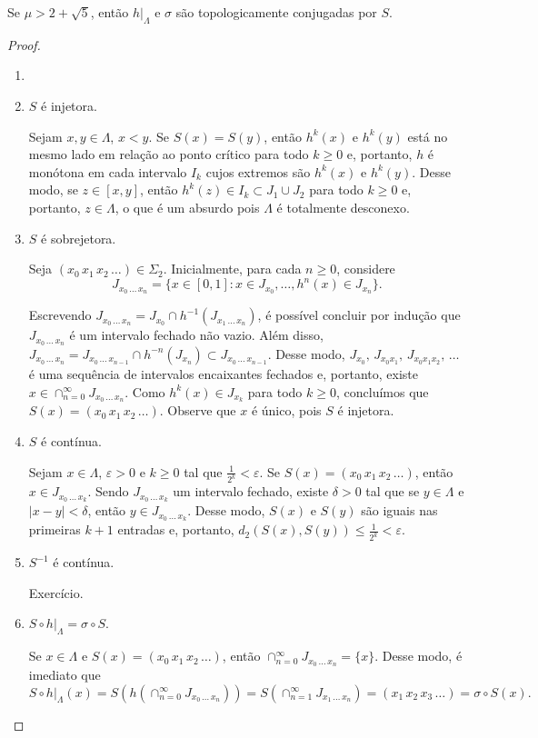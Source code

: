 \begin{theorem}
Se $\mu > 2 + \sqrt{5}$, então $h|_\Lambda$ e $\sigma$ são topologicamente conjugadas por $S$.
\end{theorem}

\begin{proof}
\begin{enumerate}[label=\alph*)]\item[]
\item $S$ é injetora.

Sejam $x, y \in \Lambda$, $x < y$. Se $S(x) = S(y)$, então $h^k(x)$ e $h^k(y)$ está no mesmo lado em relação ao ponto crítico para todo $k \geq 0$ e, portanto, $h$ é monótona em cada intervalo $I_k$ cujos extremos são $h^k(x)$ e $h^k(y)$. Desse modo, se $z \in [x, y]$, então $h^k(z) \in I_k \subset J_1 \cup J_2$ para todo $k \geq 0$ e, portanto, $z \in \Lambda$, o que é um absurdo pois $\Lambda$ é totalmente desconexo.

\item $S$ é sobrejetora.

Seja $(x_0 \, x_1 \, x_2 \, \dots) \in \Sigma_2$. Inicialmente, para cada $n \geq 0$, considere
$$J_{x_0 \, \dots \, x_n} = \lbrace x \in [0,1] : x \in J_{x_0}, \dots, h^n(x) \in J_{x_n} \rbrace.$$

Escrevendo $J_{x_0 \, \dots \, x_n} = J_{x_0} \cap h^{-1}(J_{x_1 \, \dots \, x_n})$, é possível concluir por indução que $J_{x_0 \, \dots \, x_n}$ é um intervalo fechado não vazio.
Além disso, $J_{x_0 \, \dots \, x_n} = J_{x_0 \, \dots \, x_{n-1}} \cap h^{-n}(J_{x_n}) \subset J_{x_0 \, \dots \, x_{n-1}}$.
Desse modo, $J_{x_0}, \, J_{x_0 x_1}, \, J_{x_0 x_1 x_2}, \, \dots$ é uma sequência de intervalos encaixantes fechados e, portanto, existe $x \in \cap_{n=0}^\infty J_{x_0 \, \dots \, x_n}$. Como $h^k(x) \in J_{x_k}$ para todo $k \geq 0$, concluímos que $S(x) = (x_0 \, x_1 \, x_2 \, \dots)$. Observe que $x$ é único, pois $S$ é injetora.

\item $S$ é contínua.

Sejam $x \in \Lambda$, $\varepsilon > 0$ e $k \geq 0$ tal que $\frac{1}{2^k} < \varepsilon$. Se $S(x) = (x_0 \, x_1 \, x_2 \, \dots)$, então $x \in J_{x_0 \, \dots \, x_k}$. Sendo $J_{x_0 \, \dots \, x_k}$ um intervalo fechado, existe $\delta > 0$ tal que se $y \in \Lambda$ e $|x-y| < \delta$, então $y \in J_{x_0 \, \dots \, x_k}$. Desse modo, $S(x)$ e $S(y)$ são iguais nas primeiras $k+1$ entradas e, portanto, $d_2(S(x), S(y)) \leq \frac{1}{2^k} < \varepsilon$.

\item $S^{-1}$ é contínua.

Exercício.

\item $S \circ h|_\Lambda = \sigma \circ S$.

Se $x \in \Lambda$ e $S(x) = (x_0 \, x_1 \, x_2 \, \dots)$, então $\cap_{n=0}^\infty J_{x_0 \, \dots \, x_n} = \lbrace x \rbrace$. Desse modo, é imediato que
$$ S \circ h|_{\Lambda}(x) = S(h(\cap_{n=0}^\infty J_{x_0 \, \dots \, x_n})) = S(\cap_{n=1}^\infty J_{x_1 \, \dots \, x_n}) = (x_1 \, x_2 \, x_3 \, \dots)  = \sigma \circ S(x).$$
\end{enumerate}
\end{proof}
